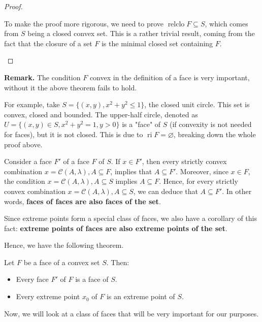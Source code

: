 \begin{proof}
\begin{itemize}
      To make the proof more rigorous, we need to prove \( \operatorname{relclo}
      F \subseteq S\), which comes from \( S \) being a closed convex set. This
      is a rather trivial result, coming from the fact that the closure of a set
      \( F \) is the minimal closed set containing \( F \).
  \end{itemize}
  \fi
\end{proof}

\textbf{Remark.} The condition \( F \) convex in the definition of a face is very
important, without it the above theorem fails to hold.

For example, take \( S = \{(x, y), x^2 + y^2 \le  1\}   \), the closed unit
circle. This set is convex, closed and bounded. The upper-half circle, denoted
as \( U = \{(x, y) \in S, x^2 + y^2 = 1, y > 0\}     \) is a "face" of \( S \)
(if convexity is not needed for faces), but it is not closed. This is due to \(
\operatorname{ri} F = \varnothing\), breaking down the whole proof above.

Consider a face \( F' \) of a face \( F \) of \( S \). If \( x \in F' \), then
every strictly convex combination \( x = \mathcal{C}(A, \lambda), A \subseteq
F\), implies that \( A \subseteq F' \). Moreover, since \( x \in F \), the
condition \( x = \mathcal{C}(A, \lambda), A \subseteq S \) implies \( A
\subseteq F \). Hence, for every strictly convex combination \( x =
\mathcal{C}(A, \lambda), A \subseteq S \), we can deduce that \( A \subseteq F'
\). In other words, \textbf{faces of faces are also faces of the set}.

Since extreme points form a special class of faces, we also have a corollary of
this fact: \textbf{extreme points of faces are also extreme points of the set}.

Hence, we have the following theorem.

\begin{theorem}
\label{thr:Faces and extreme points of faces}
  Let \( F \) be a face of a convex set \( S \). Then:
  \begin{itemize}
  \item Every face \( F' \) of \( F \) is a face of \( S \).
  \item Every extreme point \( x_{0} \) of \( F \) is an extreme point of \( S
    \).
  \end{itemize}
\end{theorem}

Now, we will look at a class of faces that will be very important for our
purposes.


